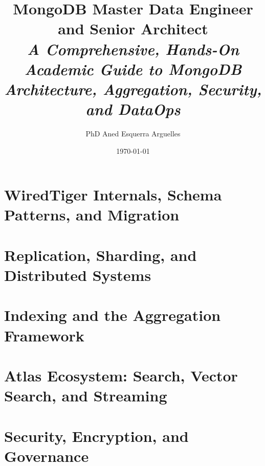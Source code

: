 \documentclass[11pt,a4paper,oneside]{book}
\title{\Huge \textbf{MongoDB Master Data Engineer and Senior Architect}\\[1em]
\Large \textit{A Comprehensive, Hands-On Academic Guide to MongoDB Architecture, Aggregation, Security, and DataOps}}
\author{PhD Aned Esquerra Arguelles}
\date{\today}
\begin{document}
\frontmatter



\tableofcontents
\listoffigures
\listoftables

\mainmatter

\setcounter{chapter}{-1}


\part{WiredTiger Internals, Schema Patterns, and Migration}





\part{Replication, Sharding, and Distributed Systems}





\part{Indexing and the Aggregation Framework}





\part{Atlas Ecosystem: Search, Vector Search, and Streaming}





\part{Security, Encryption, and Governance}




\end{document}
